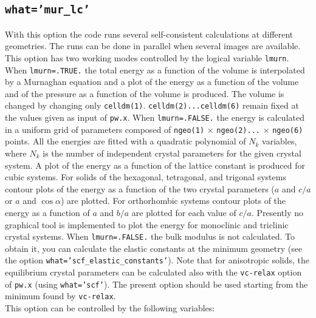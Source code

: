 \documentclass[12pt,a4paper]{article}
\begin{document}
\subsection{\texttt{what='mur\_lc'}}
With this option the code runs several self-consistent calculations
at different geometries. The runs can be done in parallel when several images 
are available. This option has two working modes controlled by the 
logical variable \texttt{lmurn}. When \texttt{lmurn=.TRUE.} the total energy as 
a function of the volume is interpolated by a Murnaghan equation and 
a plot of the energy as a function of the volume and of the pressure 
as a function of the volume is produced. The volume is changed by 
changing only \texttt{celldm(1)}. \texttt{celldm(2)...celldm(6)} remain fixed
at the values given as input of \texttt{pw.x}.
When \texttt{lmurn=.FALSE.} the energy is calculated in a uniform
grid of parameters composed of \texttt{ngeo(1)} $\times$ \texttt{ngeo(2)...}
$\times$ \texttt{ngeo(6)} points.
All the energies are fitted with a quadratic polynomial of
$N_k$ variables, where $N_k$ is the number of independent crystal
parameters for the given crystal system. A plot of the energy as 
a function of the lattice constant is produced for cubic systems.
For solids of the hexagonal, tetragonal, and trigonal systems
contour plots of the energy as a function of the two crystal parameters
($a$ and $c/a$ or $a$ and $\cos\alpha$)
are plotted. For orthorhombic systems contour plots of the energy as a function
of $a$ and $b/a$ are plotted for each value of $c/a$. 
Presently no graphical tool is implemented to plot the energy
for monoclinic and triclinic crystal systems. 
When \texttt{lmurn=.FALSE.} the bulk modulus
is not calculated. To obtain it, you can calculate the elastic constants at the
minimum geometry (see the option \texttt{what='scf\_elastic\_constants'}). 
Note that for anisotropic solids, the equilibrium crystal parameters
can be calculated also with the \texttt{vc-relax} option of \texttt{pw.x} 
(using \texttt{what='scf'}).
The present option should be used starting from the minimum found by
\texttt{vc-relax}. \\
This option can be controlled by the following variables:
\end{document}
